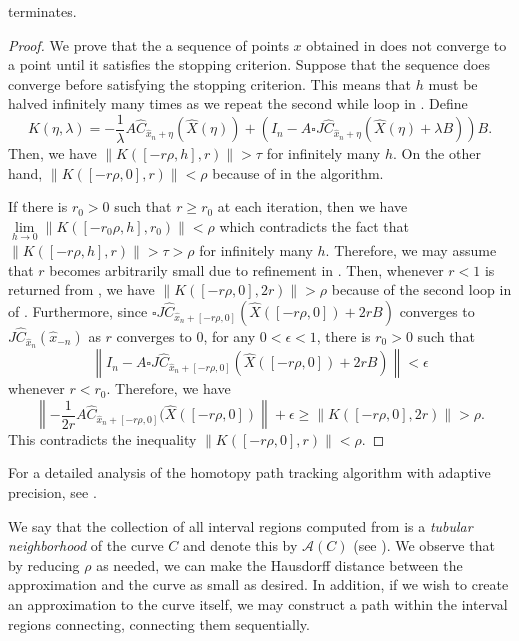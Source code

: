 \begin{thm}
 terminates.
\end{thm}
\begin{proof}
    We prove that the a sequence of points $x$ obtained in  does not converge to a point until it satisfies the stopping criterion.  Suppose that the sequence does converge before satisfying the stopping criterion.  This means that $h$ must be halved infinitely many times as we repeat the second while loop in .  Define $$K(\eta,\lambda)=-\frac{1}{\lambda}A\hat{C}_{\hat{x}_n+\eta}(\hat{X}(\eta))+\left(I_n-A\square J\hat{C}_{\hat{x}_n+\eta}(\hat{X}(\eta)+\lambda B)\right)B.$$
    Then, we have $\|K([-r\rho,h],r)\|>\tau$ for infinitely many $h$.
    On the other hand, $\|K([-r\rho,0],r)\|< \rho$ because of  in the algorithm. 
    
    If there is $r_0>0$ such that $r\geq r_0$ at each iteration, then we have $\lim\limits_{h\rightarrow 0}\|K([-r_0\rho,h],r_0)\|<\rho$ which contradicts the fact that $\|K([-r\rho,h],r)\|>\tau>\rho$ for infinitely many $h$.
    Therefore, we may assume that $r$ becomes arbitrarily small due to refinement in  . %
    Then, whenever $r<1$ is returned from , we have
    $\|K([-r\rho,0],2r)\|>\rho$ because of the second loop in  of .
    Furthermore,
    since $\square J\hat{C}_{\hat{x}_n+[-r\rho,0]}(\hat{X}([-r\rho,0])+2rB)$ converges to $J\hat{C}_{\hat{x}_n}(\hat{x}_{-n})$ as $r$ converges to $0$, for any $0<\epsilon<1$, there is $r_0>0$ such that 
    \[\left\|I_n-A\square J\hat{C}_{\hat{x}_n+[-r\rho,0]}(\hat{X}([-r\rho,0])+2rB)\right\|<\epsilon\]
    whenever $r<r_0$.
    Therefore, we have $$\left\|-\frac{1}{2r}A\hat{C}_{\hat{x}_n+[-r\rho,0]}(\hat{X}([-r\rho,0])\right\|+\epsilon \geq \|K([-r\rho,0],2r)\|>\rho.$$ This contradicts the inequality $\|K([-r\rho,0],r)\|<\rho$.
\end{proof}

For a detailed analysis of the homotopy path tracking algorithm with adaptive precision, see \cite[Section 5.3]{guillemot2024validated}.

We say that the collection of all interval regions computed from  is a \emph{tubular neighborhood} of the curve $C$ and denote this by $\mathcal{A}(C)$ (see ).  We observe that by reducing $\rho$ as needed, we can make the Hausdorff distance between the approximation and the curve as small as desired.  In addition, if we wish to create an approximation to the curve itself, we may construct a path within the interval regions connecting, connecting them sequentially.

